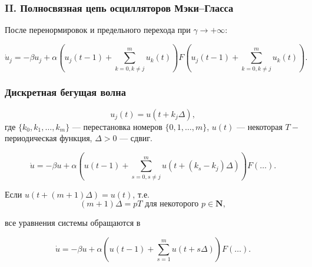 \begin{frame}
	\frametitle{II. Полносвязная цепь осцилляторов Мэки--Гласса}
	
	После перенормировок и предельного перехода при $\gamma \to +\infty$:
	
	\begin{equation*}
		\dot{u}_j=-\beta u_j+\alpha\left(u_j(t-1)+ \sum\limits_{k=0, k\neq j}^{m} u_{k}(t)\right)F\left(u_j(t-1)+\sum\limits_{k=0, k\neq j}^{m} u_{k}(t)\right).
	\end{equation*}

\end{frame}


\begin{frame}
	\frametitle{Дискретная бегущая волна}
	
	\begin{equation}
		\label{eq:discrete_wave}
		u_j(t) = u(t + k_j\Delta),   
	\end{equation}
	где $\{k_0, k_1, \ldots, k_m\}$ --- перестановка номеров $\{0, 1, \ldots, m\}$, $u(t)$ --- некоторая $T-$периодическая функция, $\Delta > 0$ --- сдвиг.
	
	\small
	\begin{equation}
		\label{eq:mg_relay_0}
		\dot{u} = -\beta u+\alpha\left(u(t-1)+ \sum_{s=0,s\neq j}^{m}u(t+(k_s-k_j)\Delta)\right)F\left(\dots\right).
	\end{equation}
	\normalsize
	
	Если $u(t + (m + 1)\Delta) = u(t)$, т.е. 
	\[(m + 1)\Delta = pT \text{ для некоторого } p \in \mathbf{N},\]
	
	все уравнения системы обращаются в
	
	\small
	\begin{equation}
		\label{eq:mg_relay_0}
		\dot{u} = -\beta u+\alpha\left(u(t - 1) + \sum_{s=1}^{m}u(t + s\Delta)\right)F\left(\dots\right).
	\end{equation}
	\normalsize
	
	
\end{frame}


